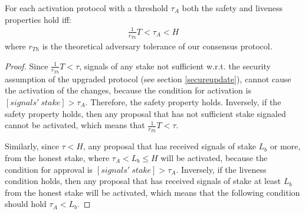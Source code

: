 \begin{theorem}\label{th:safety_and_liveness_condition_activation}
	For each activation protocol with a threshold $\tau_A$ 
	both the safety and liveness properties hold iff:
	\begin{align*} 
		\frac{1}{r_{Th}}T < \tau_A < H 
	\end{align*}
	where $r_{Th}$ is the 
	theoretical 
	adversary tolerance of our consensus protocol.
	\begin{proof}
		Since $\frac{1}{r_{Th}}T < \tau$, signals of any stake not sufficient 
		w.r.t. the security assumption of the upgraded protocol (see section 
		\ref{secureupdate}), cannot cause the activation of the changes, 
		because the condition for activation is $[signals'\ stake] > 
		\tau_A$. Therefore, the safety property holds. Inversely, if the safety 
		property holds, then any proposal that has not sufficient stake 
		signaled cannot be activated, which means that $\frac{1}{r_{Th}}T < 
		\tau$. 
		
		Similarly, since $\tau < H$, any proposal that has 
		received signals of stake $L_b$ or more, from the honest stake, where $ 
		\tau_A < L_b \leq H$ will be 
		activated, because the condition for approval is $[signals'\ stake] > 
		\tau_A$. Inversely, if the liveness condition holds, then any proposal 
		that has received signals of stake  at least $L_b$ from the honest 
		stake 
		will be activated, which means that the following 
		condition should hold $\tau_A < L_b$.
	\end{proof}
\end{theorem}
